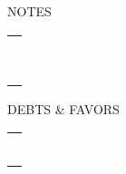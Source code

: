\begin{dossier}

\begin{minipage}[b][9.3cm][t]{25.5cm}
\begin{dossierbox}{25.5cm}{15cm}{NOTES}
\begin{adjustwidth*}{0cm}{.2cm}
\vspace{-.1cm}
\begin{tabu}{p{25.4cm}}
\\[.20cm]
\hline\\[.20cm]
\hline\\[.20cm]
\hline\\[.20cm]
\hline\\[.20cm]
\hline\\[.20cm]
\hline\\[.20cm]
\hline\\[.20cm]
\hline\\[.20cm]
\hline\\[.20cm]
\hline\\[.20cm]
\end{tabu}
\end{adjustwidth*}
\end{dossierbox}
\end{minipage}
\begin{minipage}[b][][t]{25.5cm}
\begin{dossierbox}{25.5cm}{15cm}{DEBTS \& FAVORS}
\begin{adjustwidth*}{0cm}{.2cm}
\vspace{-.1cm}
\begin{tabu}{p{25.4cm}}
\\[.20cm]
\hline\\[.20cm]
\hline\\[.20cm]
\hline\\[.20cm]
\hline\\[.20cm]
\hline\\[.20cm]
\hline\\[.20cm]
\hline\\[.20cm]
\hline
\end{tabu}
\end{adjustwidth*}
\end{dossierbox}
\end{minipage}


\end{dossier}

